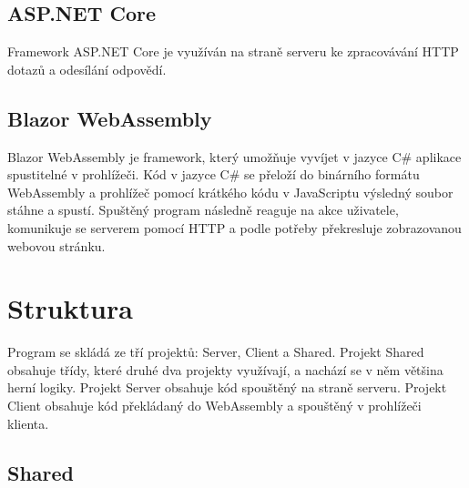 \documentclass[a4paper,12pt]{article}
\begin{document}
\subsection{ASP.NET Core}
Framework ASP.NET Core je využíván na straně serveru ke zpracovávání HTTP dotazů a odesílání odpovědí.
\subsection{Blazor WebAssembly}
Blazor WebAssembly je framework, který umožňuje vyvíjet v jazyce C\# aplikace spustitelné v prohlížeči. Kód v jazyce C\# se přeloží do binárního formátu WebAssembly a prohlížeč pomocí krátkého kódu v JavaScriptu výsledný soubor stáhne a spustí. Spuštěný program následně reaguje na akce uživatele, komunikuje se serverem pomocí HTTP a podle potřeby překresluje zobrazovanou webovou stránku.

\section{Struktura}
Program se skládá ze tří projektů: Server, Client a Shared. Projekt Shared obsahuje třídy, které druhé dva projekty využívají, a nachází se v něm většina herní logiky. Projekt Server obsahuje kód spouštěný na straně serveru. Projekt Client obsahuje kód překládaný do WebAssembly a spouštěný v prohlížeči klienta.

\subsection{Shared}

\newpage
\printbibliography[heading=bibintoc, title={Použitá literatura}]
\end{document}
